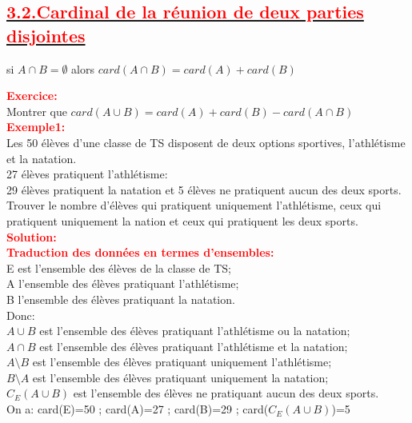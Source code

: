 \documentclass[12pt]{article}
\begin{document}
\subsection*{\underline{\textbf{\textcolor{red}{3.2.Cardinal de la réunion de deux parties disjointes}}}}
si $A \cap B=\emptyset $ alors $card(A \cap B)=card(A)+card(B)$ 
\begin{center}
\end{center}
\textbf{\textcolor{red}{Exercice:}}\\
Montrer que $card(A \cup B)=card(A)+card(B)-card(A \cap B)$\\
\textbf{\textcolor{red}{Exemple1:}}\\
Les 50 élèves d'une classe de TS disposent de deux options sportives, l'athlétisme et la natation.\\27 élèves pratiquent l'athlétisme:\\ 29 élèves pratiquent la natation et 5 élèves ne pratiquent aucun des deux sports.\\
Trouver le nombre d'élèves qui pratiquent uniquement l'athlétisme, ceux qui pratiquent uniquement la nation  et ceux qui pratiquent les deux sports.\\
\textbf{\textcolor{red}{Solution:}}\\
\textbf{\textcolor{red}{Traduction des données en termes d'ensembles:}}\\
E est l'ensemble des élèves de la classe de TS;\\
A l'ensemble des élèves pratiquant l'athlétisme;\\
B l'ensemble des élèves pratiquant la natation.\\
Donc:\\
$A\cup B$ est l'ensemble des élèves pratiquant l'athlétisme ou la natation;\\
$A\cap B$ est l'ensemble des élèves pratiquant l'athlétisme et la natation;\\
$A\setminus B$ est l'ensemble des élèves pratiquant uniquement l'athlétisme;\\
$B\setminus A$ est l'ensemble des élèves pratiquant uniquement la natation;\\
$C_{E}(A\cup B)$ est l'ensemble des élèves ne pratiquant aucun des deux sports.\\
On a: card(E)=50 ; card(A)=27 ; card(B)=29 ; card($C_{E}(A\cup B)$)=5\\
\end{document}
